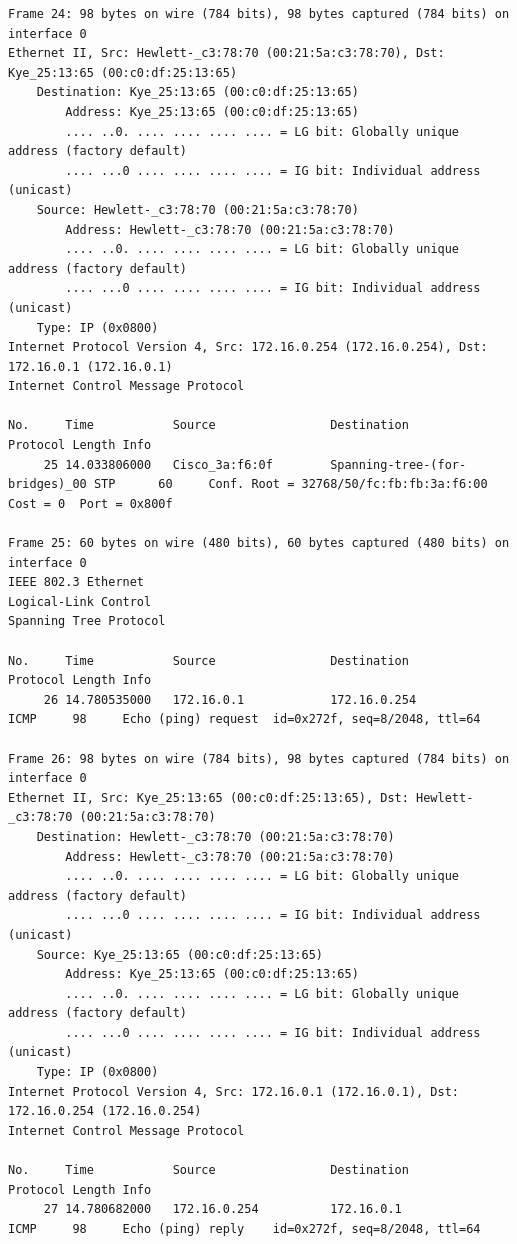 \documentclass[a4paper,11pt]{article}
\begin{document}
\begin{lstlisting}
Frame 24: 98 bytes on wire (784 bits), 98 bytes captured (784 bits) on interface 0
Ethernet II, Src: Hewlett-_c3:78:70 (00:21:5a:c3:78:70), Dst: Kye_25:13:65 (00:c0:df:25:13:65)
    Destination: Kye_25:13:65 (00:c0:df:25:13:65)
        Address: Kye_25:13:65 (00:c0:df:25:13:65)
        .... ..0. .... .... .... .... = LG bit: Globally unique address (factory default)
        .... ...0 .... .... .... .... = IG bit: Individual address (unicast)
    Source: Hewlett-_c3:78:70 (00:21:5a:c3:78:70)
        Address: Hewlett-_c3:78:70 (00:21:5a:c3:78:70)
        .... ..0. .... .... .... .... = LG bit: Globally unique address (factory default)
        .... ...0 .... .... .... .... = IG bit: Individual address (unicast)
    Type: IP (0x0800)
Internet Protocol Version 4, Src: 172.16.0.254 (172.16.0.254), Dst: 172.16.0.1 (172.16.0.1)
Internet Control Message Protocol

No.     Time           Source                Destination           Protocol Length Info
     25 14.033806000   Cisco_3a:f6:0f        Spanning-tree-(for-bridges)_00 STP      60     Conf. Root = 32768/50/fc:fb:fb:3a:f6:00  Cost = 0  Port = 0x800f

Frame 25: 60 bytes on wire (480 bits), 60 bytes captured (480 bits) on interface 0
IEEE 802.3 Ethernet 
Logical-Link Control
Spanning Tree Protocol

No.     Time           Source                Destination           Protocol Length Info
     26 14.780535000   172.16.0.1            172.16.0.254          ICMP     98     Echo (ping) request  id=0x272f, seq=8/2048, ttl=64

Frame 26: 98 bytes on wire (784 bits), 98 bytes captured (784 bits) on interface 0
Ethernet II, Src: Kye_25:13:65 (00:c0:df:25:13:65), Dst: Hewlett-_c3:78:70 (00:21:5a:c3:78:70)
    Destination: Hewlett-_c3:78:70 (00:21:5a:c3:78:70)
        Address: Hewlett-_c3:78:70 (00:21:5a:c3:78:70)
        .... ..0. .... .... .... .... = LG bit: Globally unique address (factory default)
        .... ...0 .... .... .... .... = IG bit: Individual address (unicast)
    Source: Kye_25:13:65 (00:c0:df:25:13:65)
        Address: Kye_25:13:65 (00:c0:df:25:13:65)
        .... ..0. .... .... .... .... = LG bit: Globally unique address (factory default)
        .... ...0 .... .... .... .... = IG bit: Individual address (unicast)
    Type: IP (0x0800)
Internet Protocol Version 4, Src: 172.16.0.1 (172.16.0.1), Dst: 172.16.0.254 (172.16.0.254)
Internet Control Message Protocol

No.     Time           Source                Destination           Protocol Length Info
     27 14.780682000   172.16.0.254          172.16.0.1            ICMP     98     Echo (ping) reply    id=0x272f, seq=8/2048, ttl=64


\end{lstlisting}
\end{document}
